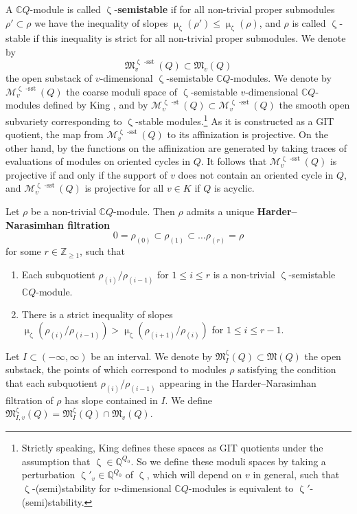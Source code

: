 \documentclass{amsart}
\DeclareMathOperator{\sst}{-sst}
\newcommand{\Msp}{\mathcal{M}}
\newcommand{\Mst}{\mathfrak{M}}
\DeclareMathOperator{\stable}{-st}
\let\bb=\mathbb
\renewcommand{\zeta}{\upzeta}
\renewcommand{\mu}{\upmu}
\theoremstyle{plain}%
\theoremstyle{definition}
\theoremstyle{remark}
\begin{document}
A $\mathbb{C}Q$-module is called $\zeta$-\textbf{semistable} if for all non-trivial proper submodules $\rho'\subset \rho$ we have the inequality of slopes $\mu_{\zeta}(\rho')\leq \mu_{\zeta}(\rho)$, and $\rho$ is called $\zeta$-stable if this inequality is strict for all non-trivial proper submodules.  We denote by 
\[
\Mst^{\zeta\sst}_v(Q)\subset \Mst_v(Q)
\]
the open substack of $v$-dimensional $\zeta$-semistable $\mathbb{C}Q$-modules.  We denote by $\Msp^{\zeta\sst}_v(Q)$ the coarse moduli space of $\zeta$-semistable $v$-dimensional $\mathbb{C}Q$-modules defined by King \cite{King}, and by $\Msp^{\zeta\stable}_v(Q)\subset \Msp^{\zeta\sst}_v(Q)$ the smooth open subvariety corresponding to $\zeta$-stable modules.\footnote{Strictly speaking, King defines these spaces as GIT quotients under the assumption that $\zeta\in\bb{Q}^{Q_0}$.  So we define these moduli spaces by taking a perturbation $\zeta'_v\in\bb{Q}^{Q_0}$ of $\zeta$, which will depend on $v$ in general, such that $\zeta$-(semi)stability for $v$-dimensional $\bb{C}Q$-modules is equivalent to $\zeta'$-(semi)stability. 
}  As it is constructed as a GIT quotient, the map from $\Msp^{\zeta\sst}_v(Q)$ to its affinization is projective.  On the other hand, by \cite[Thm. 1]{LeBPro} the functions on the affinization are generated by taking traces of evaluations of modules on oriented cycles in $Q$.  It follows that $\Msp^{\zeta\sst}_v(Q)$ is projective if and only if the support of $v$ does not contain an oriented cycle in $Q$, and $\Msp^{\zeta\sst}_v(Q)$ is projective for all $v\in K$ if $Q$ is acyclic.

Let $\rho$ be a non-trivial $\mathbb{C} Q$-module.  Then $\rho$ admits a unique \textbf{Harder--Narasimhan filtration}
\[
0=\rho_{(0)}\subset \rho_{(1)}\subset\ldots\rho_{(r)}=\rho
\]
for some $r\in\mathbb{Z}_{\geq 1}$, such that
\begin{enumerate}
    \item Each subquotient $\rho_{(i)}/\rho_{(i-1)}$ for $1\leq i\leq r$ is a non-trivial $\zeta$-semistable $\mathbb{C}Q$-module.
    \item There is a strict inequality of slopes $\mu_{\zeta}(\rho_{(i)}/\rho_{(i-1)})>\mu_{\zeta}(\rho_{(i+1)}/\rho_{(i)})$ for $1\leq i\leq r-1$.
\end{enumerate}
Let $I\subset (-\infty,\infty)$ be an interval.  We denote by $\Mst^{\zeta}_I(Q)\subset \Mst(Q)$ the open substack, the points of which correspond to modules $\rho$ satisfying the condition that each subquotient $\rho_{(i)}/\rho_{(i-1)}$ appearing in the Harder--Narasimhan filtration of $\rho$ has slope contained in $I$.  We define $\Mst_{I,v}^{\zeta}(Q)=\Mst_I^{\zeta}(Q)\cap \Mst_v(Q)$.
\end{document}
